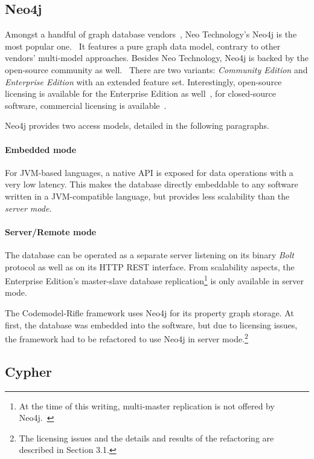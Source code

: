 \subsection{Neo4j}

Amongst a handful of graph database vendors~\cite{graph-dbs}, Neo Technology's Neo4j is the most popular one.~\cite{graph-dbs-raking} It features a pure graph data model, contrary to other vendors' multi-model approaches. Besides Neo Technology, Neo4j is backed by the open-source community as well.~\cite{neo4j-github} There are two variants: \emph{Community Edition} and \emph{Enterprise Edition} with an extended feature set. Interestingly, open-source licensing is available for the Enterprise Edition as well~\cite{neo4j-opensource}, for closed-source software, commercial licensing is available~\cite{neo4j-licensing}.

Neo4j provides two access models, detailed in the following paragraphs.

\paragraph{Embedded mode} For JVM-based languages, a native API is exposed for data operations with a very low latency. This makes the database directly embeddable to any software written in a JVM-compatible language, but provides less scalability than the \emph{server mode}.

\paragraph{Server/Remote mode} The database can be operated as a separate server listening on its binary \emph{Bolt} protocol as well as on its HTTP REST interface. From scalability aspects, the Enterprise Edition's master-slave database replication\footnote{At the time of this writing, multi-master replication is not offered by Neo4j.~\cite{neo4j-clustering-architecture}} is only available in server mode.

The Codemodel-Rifle framework uses Neo4j for its property graph storage. At first, the database was embedded into the software, but due to licensing issues, the framework had to be refactored to use Neo4j in server mode.\footnote{The licensing issues and the details and results of the refactoring are described in Section 3.1.}

\subsection{Cypher}

